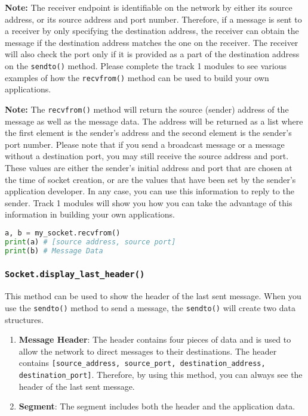 \documentclass[11pt]{article}
\begin{document}
\textbf{Note:}
The receiver endpoint is identifiable on the network by either its source address, or its source address and port number.
Therefore, if a message is sent to a receiver by only specifying the destination address, the receiver can obtain the message if the destination address matches the one on the receiver.
The receiver will also check the port only if it is provided as a part of the destination address on the \texttt{sendto()} method.
Please complete the track 1 modules to see various examples of how the \texttt{recvfrom()} method can be used to build your own applications.

\textbf{Note:}
The \texttt{recvfrom()} method will return the source (sender) address of the message as well as the message data.
The address will be returned as a list where the first element is the sender's address and the second element is the sender's port number.
Please note that if you send a broadcast message or a message without a destination port, you may still receive the source address and port.
These values are either the sender's initial address and port that are chosen at the time of socket creation, or are the values that have been set by the sender's application developer.
In any case, you can use this information to reply to the sender.
Track 1 modules will show you how you can take the advantage of this information in building your own applications.

\begin{lstlisting}[caption={Example for using \texttt{recvfrom()}}, language=Python]
a, b = my_socket.recvfrom()
print(a) # [source address, source port]
print(b) # Message Data
\end{lstlisting}

\subsubsection{\texttt{Socket.display\_last\_header()}}
This method can be used to show the header of the last sent message. When you use the \texttt{sendto()} method to send a message, the \texttt{sendto()} will create two data structures.
\begin{enumerate}
    \item \textbf{Message Header}: The header contains four pieces of data and is used to allow the network to direct messages to their destinations. The header contains \texttt{[source\_address, source\_port, destination\_address, destination\_port]}. Therefore, by using this method, you can always see the header of the last sent message.
    \item \textbf{Segment}: The segment includes both the header and the application data.
\end{enumerate}
\end{document}
